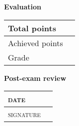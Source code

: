 {\bf\large Evaluation}\\

\begin{center}
	\cellwidth{2.2em}
	\addpoints
	\gradetable[v]
\end{center}

\begin{table}[h]
	\centering
		\begin{tabular}{|l||c|}
		\hline 
		Total points & \numpoints \\ \hline 
		Achieved points & \hspace{3cm} \\ \hline
		Grade & \\ \hline 
		\end{tabular}
\end{table}

{\bf\large Post-exam review}\\
\begin{table}[h]
	\centering
		\begin{tabular}{*{2}{|l|}}
			\hline
			\textsc{date} &  \\ \hline
			\textsc{signature} & \hspace{4cm} \\ \hline
		\end{tabular}
\end{table}
